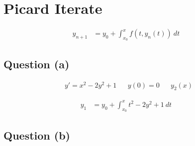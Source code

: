 \section{Picard Iterate}
	\begin{align}
		y_{n+1} &= y_{0} + \int_{x_{0}}^{x} f(t,y_{n}(t)) \ dt&
	\end{align}

	\subsection{Question (a)}
		\begin{align}
			&y' = x^{2} - 2y^{2} + 1&
			&y(0) = 0&
			&y_{2}(x)&
		\end{align}

		\begin{align}
			y_{1} &= y_{0} + \int_{x_{0}}^{x} t^{2} - 2y^{2} + 1 \ dt&
		\end{align}

	\subsection{Question (b)}
